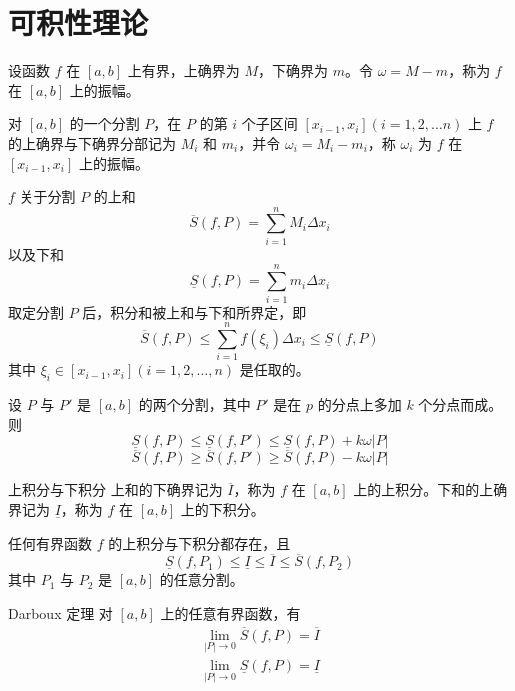 
\section{可积性理论}

\begin{definition}
    设函数 $f$ 在 $[a,b]$ 上有界，上确界为 $M$，下确界为 $m$。令 $\omega = M - m$，称为 $f$ 在 $[a,b]$ 上的振幅。

    对 $[a,b]$ 的一个分割 $P$，在 $P$ 的第 $i$ 个子区间 $[x_{i - 1},x_i](i = 1,2, \ldots n)$ 上 $f$ 的上确界与下确界分部记为 $M_i$ 和 $m_i$，并令 $\omega_i = M_i - m_i$，称 $\omega_i$ 为 $f$ 在 $[x_{i - 1},x_i]$ 上的振幅。
\end{definition}

\begin{definition}
    $f$ 关于分割 $P$ 的上和
    \[\overline{S}(f,P) = \sum_{i = 1}^{n}M_{i}\Delta x_i\]
    以及下和
    \[\underline{S}(f,P) = \sum_{i = 1}^{n}m_{i}\Delta x_i\]
    取定分割 $P$ 后，积分和被上和与下和所界定，即
    \[\overline{S}(f,P) \leqslant  \sum_{i = 1}^{n}f(\xi_{i})\Delta x_i \leqslant \underline{S}(f,P)\]
    其中 $\xi_i \in [x_{i - 1},x_i](i = 1,2, \ldots ,n)$ 是任取的。
\end{definition}

\begin{theorem}
    设 $P$ 与 $P'$ 是 $[a,b]$ 的两个分割，其中 $P'$ 是在 $p$ 的分点上多加 $k$ 个分点而成。则
    \[\underline{S}(f,P) \leqslant \underline{S}(f,P') \leqslant \underline{S}(f,P) + k\omega|P|\]
    \[\overline{S}(f,P) \geqslant \overline{S}(f,P') \geqslant \overline{S}(f,P) - k\omega|P|\]
\end{theorem}

\begin{definition}{上积分与下积分}
    上和的下确界记为 $\overline{I}$，称为 $f$ 在 $[a,b]$ 上的上积分。下和的上确界记为 $\underline{I}$，称为 $f$ 在 $[a,b]$ 上的下积分。

    任何有界函数 $f$ 的上积分与下积分都存在，且
    \[\underline{S}(f,P_1) \leqslant \underline{I} \leqslant \overline{I} \leqslant \overline{S}(f,P_2)\]
    其中 $P_1$ 与 $P_2$ 是 $[a,b]$ 的任意分割。
\end{definition}

\begin{theorem}{Darboux 定理}
    对 $[a,b]$ 上的任意有界函数，有
    \begin{align*}
        \lim_{|P| \to 0}\overline{S}(f,P) = \overline{I} \\
        \lim_{|P| \to 0}\underline{S}(f,P) = \underline{I}
    \end{align*}
\end{theorem}


